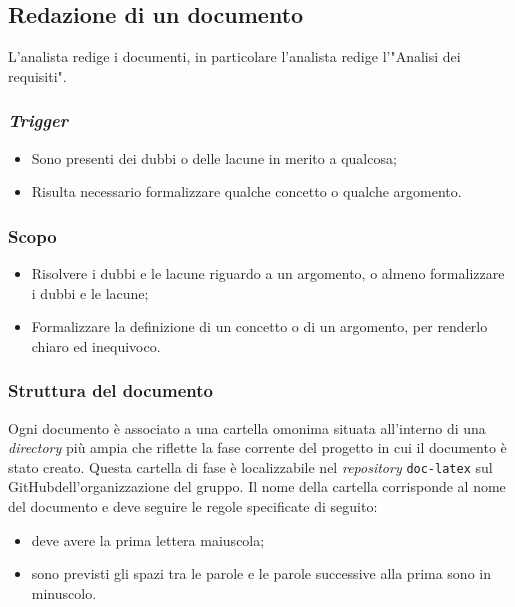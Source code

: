 \subsection{Redazione di un documento}
\label{redazione-documento}

L'analista redige i documenti, in particolare l'analista redige l'"Analisi dei
requisiti".

\subsubsection{\textit{Trigger}}
\begin{itemize}
	\item Sono presenti dei dubbi o delle lacune in merito a qualcosa;

	\item Risulta necessario formalizzare qualche concetto o qualche argomento.
\end{itemize}

\subsubsection{Scopo}
\begin{itemize}
	\item Risolvere i dubbi e le lacune riguardo a un argomento, o almeno
	      formalizzare i dubbi e le lacune;

	\item Formalizzare la definizione di un concetto o di un argomento, per
	      renderlo chiaro ed inequivoco.
\end{itemize}

\subsubsection{Struttura del documento}
Ogni documento è associato a una cartella omonima situata all'interno di una \textit{directory} più ampia che riflette la fase corrente del progetto in cui il documento è stato creato.
Questa cartella di fase è localizzabile nel \textit{repository\g} \texttt{doc-latex} sul GitHub\g dell'organizzazione del gruppo.
Il nome della cartella corrisponde al nome del documento e deve seguire le regole specificate di seguito:
\begin{itemize}
	\item deve avere la prima lettera maiuscola;
	\item sono previsti gli spazi tra le parole e le parole successive alla
	      prima sono in minuscolo.
\end{itemize}

